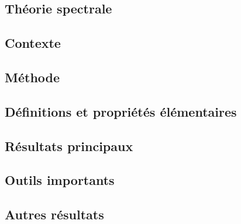 \documentclass[11pt,a4paper]{article}
\begin{document}
\newpage
\begin{center}  
\section*{Théorie spectrale} 
\end{center}


\subsection*{Contexte}

\subsection*{Méthode}

\subsection*{Définitions et propriétés élémentaires}



\subsection*{Résultats principaux}

\subsection*{Outils importants}


\subsection*{Autres résultats}
\end{document}
